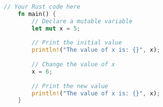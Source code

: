 \newpage


\begin{lstlisting}[language=Rust,
	style=mystyle,
	caption={An example of Rust code.},
	label={example-rust}]
	// Your Rust code here
	fn main() {
		// Declare a mutable variable
		let mut x = 5; 
		
		// Print the initial value
		println!("The value of x is: {}", x); 
		
		// Change the value of x
		x = 6; 
		
		// Print the new value
		println!("The value of x is: {}", x); 
	}
\end{lstlisting}